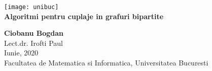 \begin{titlepage}
  \vspace{1 in}
  \begin{center}
    \hspace{4in} \texttt{[image: unibuc]}
    \\
    \huge
    \textbf{Algoritmi pentru cuplaje in grafuri bipartite} \\
    \vspace{0.8 in}

    \Large
    \textbf{Ciobanu Bogdan} \\
    Lect.dr. Irofti Paul \\

    \vspace*{\fill}
    Iunie, 2020 \\
    Facultatea de Matematica si Informatica, Universitatea Bucuresti \\

  \end{center}
\end{titlepage}
